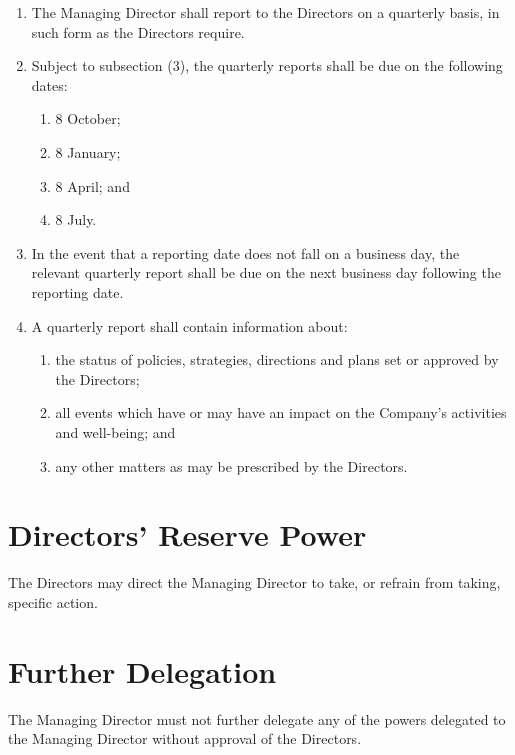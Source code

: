 \documentclass[a4paper,10pt]{article}
\begin{document}
\begin{enumerate}
    \item The Managing Director shall report to the Directors on a quarterly basis, in such form as the Directors require.
    \item Subject to subsection (3), the quarterly reports shall be due on the following dates:
    \begin{enumerate}
        \item 8 October;
        \item 8 January;
        \item 8 April; and
        \item 8 July. %
    \end{enumerate}
    \item In the event that a reporting date does not fall on a business day, the relevant quarterly report shall be due on the next business day following the reporting date.
    \item A quarterly report shall contain information about:
    \begin{enumerate}
        \item the status of policies, strategies, directions and plans set or approved by the Directors;
        \item all events which have or may have an impact on the Company's activities and well-being; and
        \item any other matters as may be prescribed by the Directors.
    \end{enumerate}
\end{enumerate}

\section{Directors' Reserve Power}

The Directors may direct the Managing Director to take, or refrain from taking, specific action.

\section{Further Delegation}

The Managing Director must not further delegate any of the powers delegated to the Managing Director without approval of the Directors.

\end{document}
